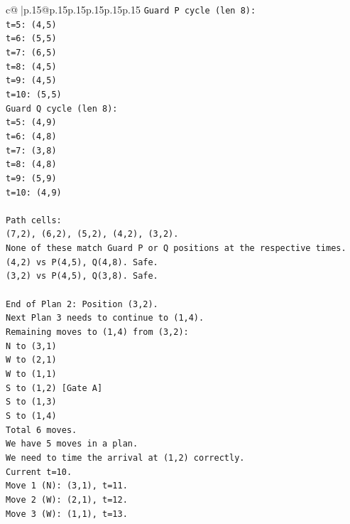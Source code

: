 \documentclass{article}
\begin{document}
{\begin{supertabular}{c@{$\;$}|p{.15\linewidth}@{}p{.15\linewidth}p{.15\linewidth}p{.15\linewidth}p{.15\linewidth}p{.15\linewidth}}
{{{\texttt{Guard P cycle (len 8):} \\
\texttt{t=5: (4,5)} \\
\texttt{t=6: (5,5)} \\
\texttt{t=7: (6,5)} \\
\texttt{t=8: (4,5)} \\
\texttt{t=9: (4,5)} \\
\texttt{t=10: (5,5)} \\
\texttt{Guard Q cycle (len 8):} \\
\texttt{t=5: (4,9)} \\
\texttt{t=6: (4,8)} \\
\texttt{t=7: (3,8)} \\
\texttt{t=8: (4,8)} \\
\texttt{t=9: (5,9)} \\
\texttt{t=10: (4,9)} \\
\\ 
\texttt{Path cells:} \\
\texttt{(7,2), (6,2), (5,2), (4,2), (3,2).} \\
\texttt{None of these match Guard P or Q positions at the respective times.} \\
\texttt{(4,2) vs P(4,5), Q(4,8). Safe.} \\
\texttt{(3,2) vs P(4,5), Q(3,8). Safe.} \\
\\ 
\texttt{End of Plan 2: Position (3,2).} \\
\texttt{Next Plan 3 needs to continue to (1,4).} \\
\texttt{Remaining moves to (1,4) from (3,2):} \\
\texttt{N to (3,1)} \\
\texttt{W to (2,1)} \\
\texttt{W to (1,1)} \\
\texttt{S to (1,2) {[}Gate A{]}} \\
\texttt{S to (1,3)} \\
\texttt{S to (1,4)} \\
\texttt{Total 6 moves.} \\
\texttt{We have 5 moves in a plan.} \\
\texttt{We need to time the arrival at (1,2) correctly.} \\
\texttt{Current t=10.} \\
\texttt{Move 1 (N): (3,1), t=11.} \\
\texttt{Move 2 (W): (2,1), t=12.} \\
\texttt{Move 3 (W): (1,1), t=13.} \\
}}}
\end{supertabular}}
\end{document}
